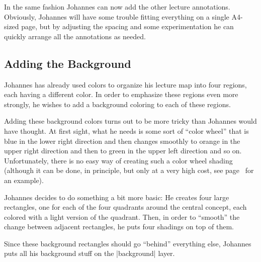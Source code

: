In the same fashion Johannes can now add the other lecture annotations.
Obviously, Johannes will have some trouble fitting everything on a single
A4-sized page, but by adjusting the spacing and some experimentation he can
quickly arrange all the annotations as needed.


\subsection{Adding the Background}

Johannes has already used colors to organize his lecture map into four regions,
each having a different color. In order to emphasize these regions even more
strongly, he wishes to add a background coloring to each of these regions.

Adding these background colors turns out to be more tricky than Johannes would
have thought. At first sight, what he needs is some sort of ``color wheel''
that is blue in the lower right direction and then changes smoothly to orange
in the upper right direction and then to green in the upper left direction and
so on. Unfortunately, there is no easy way of creating such a color wheel
shading (although it can be done, in principle, but only at a very high cost,
see page~\pageref{shading-color-wheel} for an example).

Johannes decides to do something a bit more basic: He creates four large
rectangles, one for each of the four quadrants around the central concept, each
colored with a light version of the quadrant. Then, in order to ``smooth'' the
change between adjacent rectangles, he puts four shadings on top of them.

Since these background rectangles should go ``behind'' everything else,
Johannes puts all his background stuff on the |background| layer.

